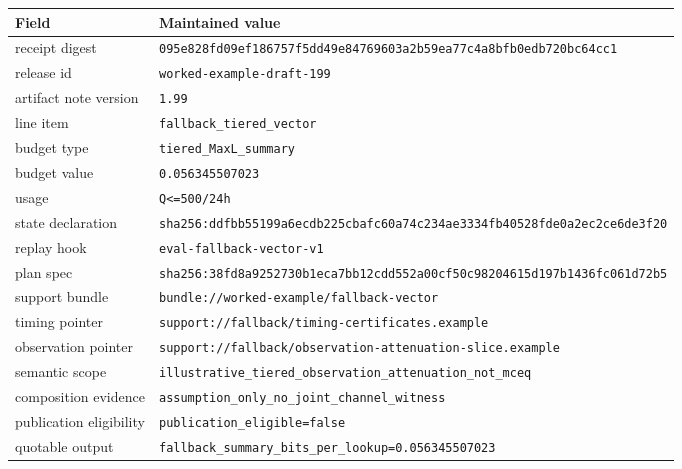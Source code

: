 \documentclass[11pt]{article}
\theoremstyle{definition}
\theoremstyle{remark}
\begin{document}
\begin{center}
\begin{tabular}{@{}ll@{}}
\toprule
Field & Maintained value \\
\midrule
receipt digest & \nolinkurl{095e828fd09ef186757f5dd49e84769603a2b59ea77c4a8bfb0edb720bc64cc1} \\
release id & \nolinkurl{worked-example-draft-199} \\
artifact note version & \nolinkurl{1.99} \\
line item & \nolinkurl{fallback_tiered_vector} \\
budget type & \nolinkurl{tiered_MaxL_summary} \\
budget value & \nolinkurl{0.056345507023} \\
usage & \nolinkurl{Q<=500/24h} \\
state declaration & \nolinkurl{sha256:ddfbb55199a6ecdb225cbafc60a74c234ae3334fb40528fde0a2ec2ce6de3f20} \\
replay hook & \nolinkurl{eval-fallback-vector-v1} \\
plan spec & \nolinkurl{sha256:38fd8a9252730b1eca7bb12cdd552a00cf50c98204615d197b1436fc061d72b5} \\
support bundle & \nolinkurl{bundle://worked-example/fallback-vector} \\
timing pointer & \nolinkurl{support://fallback/timing-certificates.example} \\
observation pointer & \nolinkurl{support://fallback/observation-attenuation-slice.example} \\
semantic scope & \nolinkurl{illustrative_tiered_observation_attenuation_not_mceq} \\
composition evidence & \nolinkurl{assumption_only_no_joint_channel_witness} \\
publication eligibility & \nolinkurl{publication_eligible=false} \\
quotable output & \nolinkurl{fallback_summary_bits_per_lookup=0.056345507023} \\
\bottomrule
\end{tabular}
\end{center}
\end{document}
